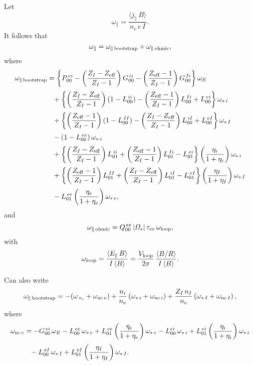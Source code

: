 \documentclass[12pt]{article}
\begin{document}
Let
\begin{equation}
\omega_\parallel = \frac{\langle j_\parallel\,B\rangle}{n_e\,e\,I}.
\end{equation}
It follows that
\begin{equation}
\omega_\parallel =\omega_{\parallel\,{\rm bootstrap}}+\omega_{\parallel\,{\rm ohmic}},
\end{equation}
where
\begin{align}
\omega_{\parallel\,{\rm bootstrap}}&=\left\{P_{00}^{\,ei}-\left(\frac{Z_I-Z_{\rm eff}}{Z_I-1}\right)G^{\,ii}_{00}- \left(\frac{Z_{\rm eff}-1}{Z_I-1}\right)G_{00}^{\,Ii}\right\}\omega_E\nonumber\\[0.5ex]
&\phantom{=} +\left\{\left(\frac{Z_I-Z_{\rm eff}}{Z_I-1}\right)(1-L^{\,ii}_{00}) - \left(\frac{Z_{\rm eff}-1}{Z_I-1}\right)L^{\,Ii}_{00}
+ L^{\,ei}_{00}\right\}\omega_{\ast\,i}\nonumber\\[0.5ex]
&\phantom{=}
+ \left\{\left(\frac{Z_{\rm eff}-1}{Z_I-1}\right)(1-L^{\,II}_{00}) - \left(\frac{Z_I-Z_{\rm eff}}{Z_I-1}\right)L^{\,iI}_{00}
+ L^{\,eI}_{00}\right\}\omega_{\ast\,I}
\nonumber\\[0.5ex]
&\phantom{=}-(1-L^{\,ee}_{00})\,\omega_{\ast\,e}\nonumber\\[0.5ex]
&\phantom{=}+\left\{\left(\frac{Z_I-Z_{\rm eff}}{Z_I-1}\right)L^{\,ii}_{01} + \left(\frac{Z_{\rm eff}-1}{Z_I-1}\right)L^{\,Ii}_{01}
- L^{\,ei}_{01}\right\}\left(\frac{\eta_i}{1+\eta_i}\right)\omega_{\ast\,i}\nonumber\\[0.5ex]
&\phantom{=}
+ \left\{\left(\frac{Z_{\rm eff}-1}{Z_I-1}\right)L^{\,II}_{01} + \left(\frac{Z_I-Z_{\rm eff}}{Z_I-1}\right)L^{\,iI}_{01}
- L^{\,eI}_{01}\right\}\left(\frac{\eta_I}{1+\eta_I}\right)\omega_{\ast\,I}
\nonumber\\[0.5ex]
&\phantom{=}-L^{\,ee}_{01}\left(\frac{\eta_e}{1+\eta_e}\right)\omega_{\ast\,e},
\end{align}
and
\begin{equation}
\omega_{\parallel\,{\rm ohmic}}= Q^{\,ee}_{00}\,|{\mit\Omega}_e|\,\tau_{ee}\,\omega_{\rm loop},
\end{equation}
with
\begin{equation}
\omega_{\rm loop} = \frac{\langle E_\parallel\,B\rangle}{I\,\langle B\rangle}= \frac{V_{\rm loop}}{2\pi}\,\frac{\langle B/R\rangle}{I\,\langle B\rangle}.
\end{equation}

Can also write
\begin{equation}
\omega_{\parallel\,{\rm bootstrap}} = -(\omega_{\,\ast_e} + \omega_{{\rm nc}\,e}) + \frac{n_i}{n_e}\left(\omega_{\ast\,i} + \omega_{{\rm nc}\,i}\right)+ \frac{Z_I\,n_I}{n_e}\left(\omega_{\ast\,I} + \omega_{{\rm nc}\,I}\right),
\end{equation}
where
\begin{align}
\omega_{{\rm nc}\,e} &= -G^{\,ei}_{00}\,\omega_E-L^{\,ee}_{00}\,\omega_{\ast\,e}+L^{\,ee}_{01}\left(\frac{\eta_e}{1+\eta_e}\right)\omega_{\ast\,e} - L_{00}^{ei}\,\omega_{\ast\,i}+L^{\,ei}_{01}\left(\frac{\eta_i}{1+\eta_i}\right)\omega_{\ast\,i}\nonumber\\[0.5ex]
&
\phantom{=}-L^{\,eI}_{00}\,\omega_{\ast\,I}+L^{\,eI}_{01}\left(\frac{\eta_I}{1+\eta_I}\right)\omega_{\ast\,I}.
\end{align}
\end{document}
